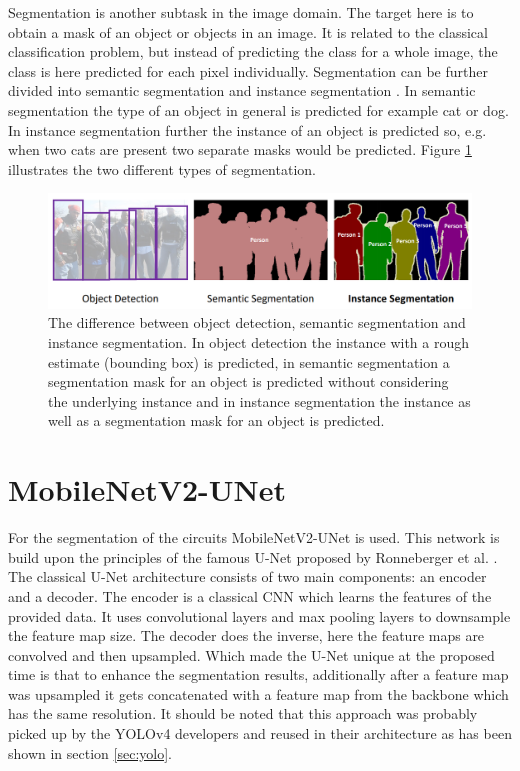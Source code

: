 \label{sec:segmentation}

Segmentation is another subtask in the image domain.
The target here is to obtain a mask of an object or objects in an image.
It is related to the classical classification problem, but instead of predicting the class for a whole image, the class is here predicted for each pixel individually.
Segmentation can be further divided into semantic segmentation \cite{semantic_segmentation} and instance segmentation \cite{mask_rcnn}.
In semantic segmentation the type of an object in general is predicted for example cat or dog.
In instance segmentation further the instance of an object is predicted so, e.g. when two cats are present two separate masks would be predicted.
Figure \ref{fig:instance_vs_semantic} illustrates the two different types of segmentation.

\begin{figure}
\begin{center}
    \includegraphics[width=16cm]{imgs/instance_vs_semantic_seg.png}
    \caption{The difference between object detection, semantic segmentation and instance segmentation. In object detection the instance with a rough estimate (bounding box) is predicted, in semantic segmentation a segmentation mask for an object is predicted without considering the underlying instance and in instance segmentation the instance as well as a segmentation mask for an object is predicted. \cite{instance_vs_semantic_fig}}
    \label{fig:instance_vs_semantic}
\end{center}
\end{figure}

\section{MobileNetV2-UNet}
\label{sec:mobilenetv2_unet}

For the segmentation of the circuits MobileNetV2-UNet \cite{mobile_unet} is used.
This network is build upon the principles of the famous U-Net proposed by Ronneberger et al. \cite{unet}.
The classical U-Net architecture consists of two main components: an encoder and a decoder.
The encoder is a classical \ac{CNN} which learns the features of the provided data.
It uses convolutional layers and max pooling layers to downsample the feature map size.
The decoder does the inverse, here the feature maps are convolved and then upsampled.
Which made the U-Net unique at the proposed time is that to enhance the segmentation results, additionally after a feature map was upsampled it gets concatenated with a feature map from the backbone which has the same resolution.
It should be noted that this approach was probably picked up by the \ac{YOLOv4} developers and reused in their architecture as has been shown in section \ref{sec:yolo}.


